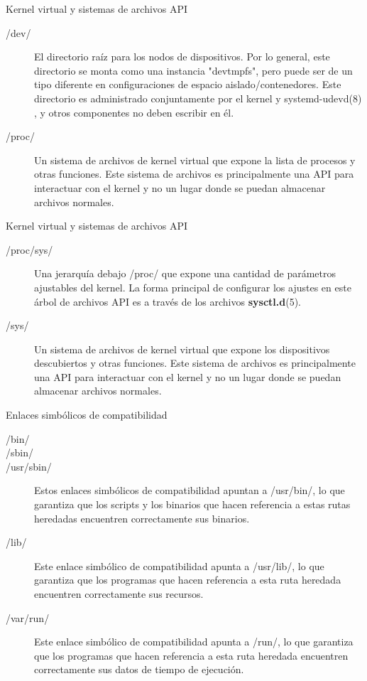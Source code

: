 \begin{frame}[c]{Kernel virtual y sistemas de archivos API}
  \begin{description}
    \item [/dev/] El directorio raíz para los nodos de dispositivos. Por lo
      general, este directorio se monta como una instancia "devtmpfs", pero
      puede ser de un tipo diferente en configuraciones de espacio
      aislado/contenedores. Este directorio es administrado conjuntamente por
      el kernel y systemd-udevd(8) , y otros componentes no deben escribir
      en él.
    \pausa
    \item [/proc/] Un sistema de archivos de kernel virtual que expone la
      lista de procesos y otras funciones. Este sistema de archivos es
      principalmente una API para interactuar con el kernel y no un lugar
      donde se puedan almacenar archivos normales.
  \end{description}
\end{frame}

\begin{frame}[c]{Kernel virtual y sistemas de archivos API}
  \begin{description}
    \item [/proc/sys/] Una jerarquía debajo /proc/ que expone una cantidad de
      parámetros ajustables del kernel. La forma principal de configurar los
      ajustes en este árbol de archivos API es a través de los archivos
      \textbf{sysctl.d}(5).
    \pausa
    \item [/sys/] Un sistema de archivos de kernel virtual que expone los
      dispositivos descubiertos y otras funciones. Este sistema de archivos es
      principalmente una API para interactuar con el kernel y no un lugar
      donde se puedan almacenar archivos normales.
  \end{description}
\end{frame}

\begin{frame}[c]{Enlaces simbólicos de compatibilidad}
  \begin{description}
    \item [/bin/]
    \item [/sbin/]
    \item [/usr/sbin/] Estos enlaces simbólicos de compatibilidad apuntan a
      /usr/bin/, lo que garantiza que los scripts y los binarios que hacen
      referencia a estas rutas heredadas encuentren correctamente sus binarios.
    \pausa
    \item [/lib/] Este enlace simbólico de compatibilidad apunta a
      /usr/lib/, lo que garantiza que los programas que hacen referencia a
      esta ruta heredada encuentren correctamente sus recursos.
    \pausa
    \item [/var/run/] Este enlace simbólico de compatibilidad apunta a /run/,
      lo que garantiza que los programas que hacen referencia a esta ruta
      heredada encuentren correctamente sus datos de tiempo de ejecución.
  \end{description}
\end{frame}
